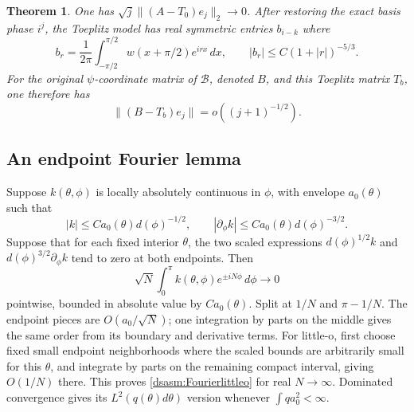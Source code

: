 \documentclass[11pt,letterpaper]{article}
\newtheorem{theorem}{Theorem}[section]
\theoremstyle{remark}\newtheorem{remark}[theorem]{Remark}
\begin{document}
\begin{theorem}\label{dsasm:thm:columns}
One has $\sqrt j\|(A-T_0)e_j\|_2\to0$.
After restoring the exact basis phase $i^j$, the Toeplitz model has
real symmetric entries $b_{i-k}$ where
\begin{equation}\label{dsasm:Toeplitzsymbol}
 b_r=\frac1{2\pi}\int_{-\pi/2}^{\pi/2}w(x+\pi/2)e^{irx}\,dx,
 \qquad |b_r|\le C(1+|r|)^{-5/3}.
\end{equation}
For the original $\psi$-coordinate matrix of $\mathcal B$, denoted
$B$, and this Toeplitz matrix $T_b$, one therefore has
\begin{equation}\label{dsasm:originalcolumns}
 \|(B-T_b)e_j\|=o((j+1)^{-1/2}).
\end{equation}
\end{theorem}

\subsection{An endpoint Fourier lemma}
Suppose $k(\theta,\phi)$ is locally absolutely continuous in $\phi$,
with envelope $a_0(\theta)$ such that
\[
 |k|\le Ca_0(\theta)d(\phi)^{-1/2},\qquad
 |\partial_\phi k|\le Ca_0(\theta)d(\phi)^{-3/2}.
\]
Suppose that for each fixed interior $\theta$, the two scaled
expressions $d(\phi)^{1/2}k$ and $d(\phi)^{3/2}\partial_\phi k$
tend to zero at both endpoints. Then
\begin{equation}\label{dsasm:Fourierlittleo}
 \sqrt N\int_0^\pi k(\theta,\phi)e^{\pm iN\phi}\,d\phi\longrightarrow0
\end{equation}
pointwise, bounded in absolute value by $Ca_0(\theta)$.
Split at $1/N$ and $\pi-1/N$. The endpoint pieces are
$O(a_0/\sqrt N)$; one integration by parts on the middle gives
the same order from its boundary and derivative terms. For little-o,
first choose fixed small endpoint neighborhoods where the scaled
bounds are arbitrarily small for this $\theta$, and integrate by
parts on the remaining compact interval, giving $O(1/N)$ there.
This proves \eqref{dsasm:Fourierlittleo} for real $N\to\infty$.
Dominated convergence gives its $L^2(q(\theta)d\theta)$ version
whenever $\int q a_0^2<\infty$.
\end{document}

